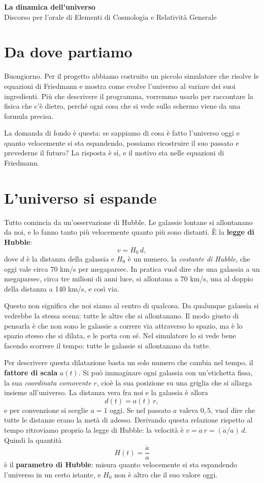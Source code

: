 \documentclass[12pt,a4paper]{article}
\begin{document}
\begin{center}
{\Large\bfseries La dinamica dell'universo}\\[3pt]
{\large Discorso per l'orale di Elementi di Cosmologia e Relatività Generale}
\end{center}

\section{Da dove partiamo}
Buongiorno. Per il progetto abbiamo costruito un piccolo simulatore che risolve le equazioni di Friedmann e mostra come evolve l'universo al variare dei suoi ingredienti. Più che descrivere il programma, vorremmo usarlo per raccontare la fisica che c'è dietro, perché ogni cosa che si vede sullo schermo viene da una formula precisa.

La domanda di fondo è questa: se sappiamo di cosa è fatto l'universo oggi e quanto velocemente si sta espandendo, possiamo ricostruire il suo passato e prevederne il futuro? La risposta è sì, e il motivo sta nelle equazioni di Friedmann.

\section{L'universo si espande}
Tutto comincia da un'osservazione di Hubble. Le galassie lontane si allontanano da noi, e lo fanno tanto più velocemente quanto più sono distanti. È la \textbf{legge di Hubble}:
\[ v = H_0\, d , \]
dove $d$ è la distanza della galassia e $H_0$ è un numero, la \emph{costante di Hubble}, che oggi vale circa 70 km/s per megaparsec. In pratica vuol dire che una galassia a un megaparsec, circa tre milioni di anni luce, si allontana a 70 km/s, una al doppio della distanza a 140 km/s, e così via.

Questo non significa che noi siamo al centro di qualcosa. Da qualunque galassia si vedrebbe la stessa scena: tutte le altre che si allontanano. Il modo giusto di pensarla è che non sono le galassie a correre via attraverso lo spazio, ma è lo spazio stesso che si dilata, e le porta con sé. Nel simulatore lo si vede bene facendo scorrere il tempo: tutte le galassie si allontanano da tutte.

Per descrivere questa dilatazione basta un solo numero che cambia nel tempo, il \textbf{fattore di scala} $a(t)$. Si può immaginare ogni galassia con un'etichetta fissa, la sua \emph{coordinata comovente} $r$, cioè la sua posizione su una griglia che si allarga insieme all'universo. La distanza vera fra noi e la galassia è allora
\[ d(t) = a(t)\, r , \]
e per convenzione si sceglie $a = 1$ oggi. Se nel passato $a$ valeva $0{,}5$, vuol dire che tutte le distanze erano la metà di adesso. Derivando questa relazione rispetto al tempo ritroviamo proprio la legge di Hubble: la velocità è $v = \dot a\, r = (\dot a / a)\, d$. Quindi la quantità
\[ H(t) = \frac{\dot a}{a} \]
è il \textbf{parametro di Hubble}: misura quanto velocemente si sta espandendo l'universo in un certo istante, e $H_0$ non è altro che il suo valore oggi.
\end{document}

